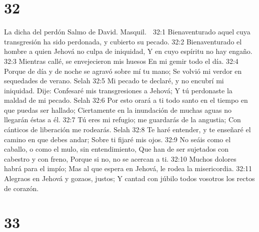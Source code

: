 \chapter{32}

La dicha del perdón 
Salmo de David. Masquil. 

32:1 Bienaventurado aquel cuya transgresión ha sido perdonada, y cubierto su pecado. 
32:2 Bienaventurado el hombre a quien Jehová no culpa de iniquidad, 
Y en cuyo espíritu no hay engaño. 
32:3 Mientras callé, se envejecieron mis huesos 
En mi gemir todo el día. 
32:4 Porque de día y de noche se agravó sobre mí tu mano; 
Se volvió mi verdor en sequedades de verano. Selah 
32:5 Mi pecado te declaré, y no encubrí mi iniquidad. 
Dije: Confesaré mis transgresiones a Jehová; 
Y tú perdonaste la maldad de mi pecado.  Selah 
32:6 Por esto orará a ti todo santo en el tiempo en que puedas ser hallado; 
Ciertamente en la inundación de muchas aguas no llegarán éstas a él. 
32:7 Tú eres mi refugio; me guardarás de la angustia; 
Con cánticos de liberación me rodearás. Selah 
32:8 Te haré entender, y te enseñaré el camino en que debes andar; 
Sobre ti fijaré mis ojos. 
32:9 No seáis como el caballo, o como el mulo, sin entendimiento, 
Que han de ser sujetados con cabestro y con freno, 
Porque si no, no se acercan a ti. 
32:10 Muchos dolores habrá para el impío; 
Mas al que espera en Jehová, le rodea la misericordia. 
32:11 Alegraos en Jehová y gozaos, justos; 
Y cantad con júbilo todos vosotros los rectos de corazón. 

\chapter{33}

